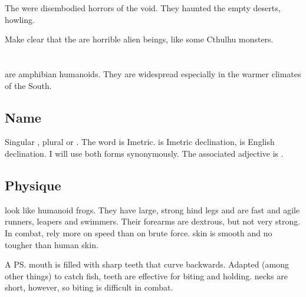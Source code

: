 The \jinn were disembodied horrors of the void.
They haunted the empty deserts, howling. 

Make clear that the \jinn are horrible alien beings, like some Cthulhu monsters.

















\section[Meccaran]{\Meccaran}
\Meccara{} are amphibian humanoids. They are widespread especially in the warmer climates of the South. 









\subsection{Name}
Singular \emph{\meccaran{}}, plural \emph{\meccara{}} or \emph{\meccarans{}}. %
The word is Imetric. \emph{\Meccara{}} is Imetric declination, \emph{\meccarans{}} is English declination. I will use both forms synonymously. 
The associated adjective is \emph{\meccaran{}}. 









\subsection{Physique}
\Meccara{} look like humanoid frogs. They have large, strong hind legs and are fast and agile runners, leapers and swimmers. Their forearms are dextrous, but not very strong. In combat, \meccarans{} rely more on speed than on brute force. \Meccaran{} skin is smooth and no tougher than human skin. 

A \ps{\meccaran} mouth is filled with sharp teeth that curve backwards. Adapted (among other things) to catch fish, \meccaran{} teeth are effective for biting and holding. \Meccaran{} necks are short, however, so biting is difficult in combat. 

